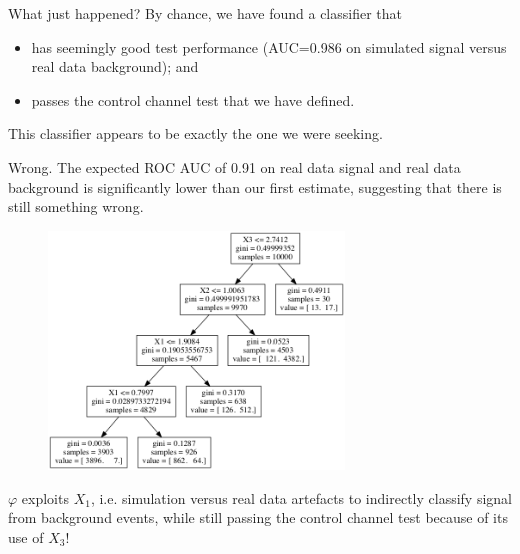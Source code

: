 \documentclass{beamer}
\begin{document}
\begin{frame}
What just happened? By chance, we have found a classifier that
\begin{itemize}
\item has seemingly good test performance (AUC=0.986 on simulated signal versus real data background); and
\item passes the control channel test that we have defined.
\end{itemize}
{\color{blue} This classifier appears to be exactly the one we were seeking}.
\vspace{1cm}

{\color{red}Wrong}. The expected ROC AUC of 0.91 on real data signal and real data
background is significantly lower than our first estimate, suggesting that
there is still something wrong.

\end{frame}

\begin{frame}
\begin{figure}
\centering
\includegraphics[width=0.7\textwidth]{tree.png}
\end{figure}

$\varphi$ exploits $X_1$, i.e. simulation versus real data
artefacts to indirectly classify signal from background events, {\color{red}while still passing the
control channel test} because of its use of $X_3$!

\end{frame}
\end{document}
